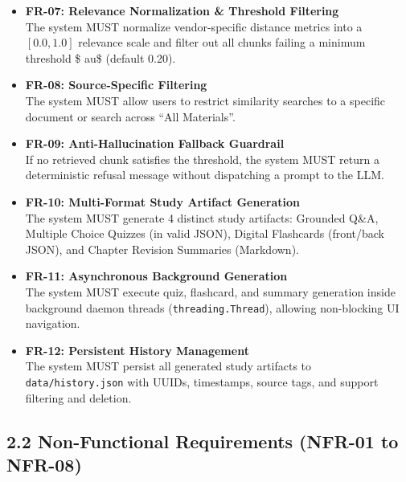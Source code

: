 \documentclass[
]{article}
\begin{document}
\begin{itemize}
  The system MUST validate user queries, reject empty/whitespace-only
  input, collapse redundant spaces, and enforce a maximum character
  length (1000 characters).
\item
  \textbf{FR-07: Relevance Normalization \& Threshold Filtering}\\
  The system MUST normalize vendor-specific distance metrics into a
  \([0.0, 1.0]\) relevance scale and filter out all chunks failing a
  minimum threshold \$ au\$ (default 0.20).
\item
  \textbf{FR-08: Source-Specific Filtering}\\
  The system MUST allow users to restrict similarity searches to a
  specific document or search across ``All Materials''.
\item
  \textbf{FR-09: Anti-Hallucination Fallback Guardrail}\\
  If no retrieved chunk satisfies the threshold, the system MUST return
  a deterministic refusal message without dispatching a prompt to the
  LLM.
\item
  \textbf{FR-10: Multi-Format Study Artifact Generation}\\
  The system MUST generate 4 distinct study artifacts: Grounded Q\&A,
  Multiple Choice Quizzes (in valid JSON), Digital Flashcards
  (front/back JSON), and Chapter Revision Summaries (Markdown).
\item
  \textbf{FR-11: Asynchronous Background Generation}\\
  The system MUST execute quiz, flashcard, and summary generation inside
  background daemon threads (\texttt{threading.\allowbreak Thread}), allowing
  non-blocking UI navigation.
\item
  \textbf{FR-12: Persistent History Management}\\
  The system MUST persist all generated study artifacts to
  \texttt{data/\allowbreak history.\allowbreak json} with UUIDs, timestamps, source tags, and
  support filtering and deletion.
\end{itemize}

\subsection{2.2 Non-Functional Requirements (NFR-01 to
NFR-08)}\label{non-functional-requirements-nfr-01-to-nfr-08}
\end{document}
